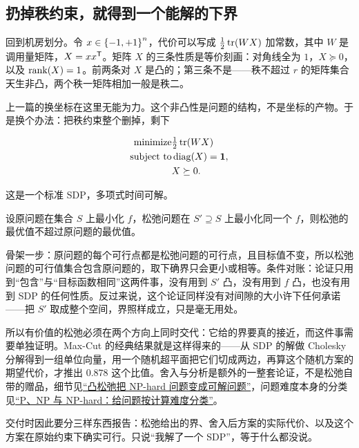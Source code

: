 \subsection{扔掉秩约束，就得到一个能解的下界}

回到机房划分。令 \(x\in\left\{-1,+1\right\}^{n}\)，代价可以写成 \(\tfrac12\operatorname{tr}(WX)\) 加常数，其中 \(W\) 是调用量矩阵，\(X=xx^{\mathsf{T}}\)。矩阵 \(X\) 的三条性质是等价刻画：对角线全为 \(1\)，\(X\succeq0\)，以及 \(\operatorname{rank}(X)=1\)。前两条对 \(X\) 是凸的；第三条不是——秩不超过 \(r\) 的矩阵集合天生非凸，两个秩一矩阵相加一般是秩二。

上一篇的换坐标在这里无能为力。这个非凸性是问题的结构，不是坐标的产物。于是换个办法：把秩约束整个删掉，剩下

\[
\begin{aligned}
\text{minimize}\space&\tfrac12\operatorname{tr}(WX)\\
\text{subject to}\space&\operatorname{diag}(X)=\mathbf{1},\\
&X\succeq0 .
\end{aligned}
\]

这是一个标准 SDP，多项式时间可解。

\begin{proposition}
设原问题在集合 \(S\) 上最小化 \(f\)，松弛问题在 \(S'\supseteq S\) 上最小化同一个 \(f\)，则松弛的最优值不超过原问题的最优值。
\end{proposition}

骨架一步：原问题的每个可行点都是松弛问题的可行点，且目标值不变，所以松弛问题的可行值集合包含原问题的，取下确界只会更小或相等。条件对账：论证只用到``包含''与``目标函数相同''这两件事，没有用到 \(S'\) 凸，没有用到 \(f\) 凸，也没有用到 SDP 的任何性质。反过来说，这个论证同样没有对间隙的大小许下任何承诺——把 \(S'\) 取成整个空间，界照样成立，只是毫无用处。

所以有价值的松弛必须在两个方向上同时交代：它给的界要真的接近，而这件事需要单独证明。Max-Cut 的经典结果就是这样得来的——从 SDP 的解做 Cholesky 分解得到一组单位向量，用一个随机超平面把它们切成两边，再算这个随机方案的期望代价，才推出 \(0.878\) 这个比值。舍入与分析是额外的一整套论证，不是松弛自带的赠品，细节见\hyperref[sec:09-Convex-Optimization/09-Complexity-and-Approximation/02]{``凸松弛把 NP-hard 问题变成可解问题''}，问题难度本身的分类见\hyperref[sec:09-Convex-Optimization/09-Complexity-and-Approximation/01]{``P、NP 与 NP-hard：给问题按计算难度分类''}。

交付时因此要分三样东西报告：松弛给出的界、舍入后方案的实际代价、以及这个方案在原始约束下确实可行。只说``我解了一个 SDP''，等于什么都没说。

